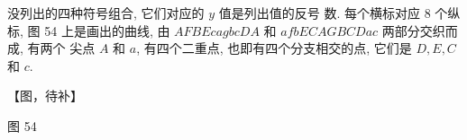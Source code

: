 没列出的四种符号组合, 它们对应的 $y$ 值是列出值的反号 数. 每个横标对应 8 个纵标, 图 54 上是画出的曲线, 由 $A F B E c a g b c D A$ 和 $a f b E C A G B C D a c$ 两部分交织而成, 有两个 尖点 $A$ 和 $a$, 有四个二重点, 也即有四个分支相交的点, 它们是 $D, E, C$ 和 $c$.


【图，待补】

图 54 

